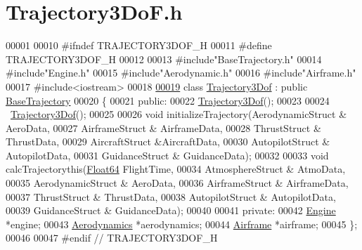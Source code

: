 \hypertarget{_trajectory3_do_f_8h_source}{}\section{Trajectory3\+Do\+F.\+h}
\label{_trajectory3_do_f_8h_source}

\begin{DoxyCode}
00001 
00010 \textcolor{preprocessor}{#ifndef TRAJECTORY3DOF\_H}
00011 \textcolor{preprocessor}{#define TRAJECTORY3DOF\_H}
00012 
00013 \textcolor{preprocessor}{#include"BaseTrajectory.h"}
00014 \textcolor{preprocessor}{#include"Engine.h"}
00015 \textcolor{preprocessor}{#include"Aerodynamic.h"}
00016 \textcolor{preprocessor}{#include"Airframe.h"}
00017 \textcolor{preprocessor}{#include<iostream>}
00018 
\hyperlink{group___trajectory}{00019} \textcolor{keyword}{class }\hyperlink{group___trajectory_class_trajectory3_dof}{Trajectory3Dof} : \textcolor{keyword}{public} \hyperlink{group___trajectory_class_base_trajectory}{BaseTrajectory}
00020 \{
00021 \textcolor{keyword}{public}:
00022     \hyperlink{group___trajectory_class_trajectory3_dof}{Trajectory3Dof}();
00023 
00024     ~\hyperlink{group___trajectory_class_trajectory3_dof}{Trajectory3Dof}();
00025 
00026     \textcolor{keywordtype}{void} initializeTrajectory(AerodynamicStruct & AeroData,
00027                                 AirframeStruct & AirframeData,
00028                                 ThrustStruct & ThrustData,
00029                                 AircraftStruct &AircraftData,
00030                                 AutopilotStruct & AutopilotData,
00031                                 GuidanceStruct & GuidanceData);
00032 
00033     \textcolor{keywordtype}{void} calcTrajectorythis(\hyperlink{group___tools_ga3f1431cb9f76da10f59246d1d743dc2c}{Float64} FlightTime,
00034                             AtmosphereStruct & AtmoData,
00035                             AerodynamicStruct & AeroData,
00036                             AirframeStruct & AirframeData,
00037                             ThrustStruct & ThrustData, 
00038                             AutopilotStruct & AutopilotData,
00039                             GuidanceStruct & GuidanceData);
00040 
00041 \textcolor{keyword}{private}:
00042     \hyperlink{group___engine_class_engine}{Engine}         *engine;
00043     \hyperlink{group___aerodynamic_class_aerodynamics}{Aerodynamics} *aerodynamics;
00044     \hyperlink{group___airframe_class_airframe}{Airframe}     *airframe;
00045 \};
00046 
00047 \textcolor{preprocessor}{#endif // TRAJECTORY3DOF\_H}
\end{DoxyCode}
